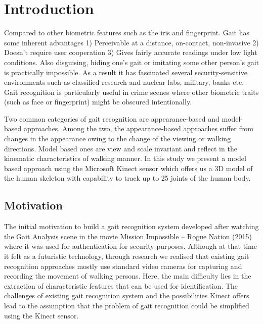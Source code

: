 \chapter{Introduction} \label{Introduction}
\noindent Compared to other biometric features such as the iris and fingerprint. Gait has some inherent advantages
1) Perceivable at a distance, on-contact, non-invasive
2) Doesn’t require user cooperation
3) Gives fairly accurate readings under low light conditions.
Also disguising, hiding one’s gait or imitating some other person’s gait is practically impossible. As a result it has fascinated several security-sensitive environments such as classified research and nuclear labs, military, banks etc. Gait recognition is particularly useful in crime scenes where other biometric traits (such as face or fingerprint) might be obscured intentionally.

\noindent Two common categories of gait recognition are appearance-based and model-based approaches. Among the two, the appearance-based approaches suffer from changes in the appearance owing to the change of the viewing or walking directions. Model based ones are view and scale invariant and reflect in the kinematic characteristics of walking manner. In this study we present a model based approach using the Microsoft Kinect sensor which offers us a 3D model of the human skeleton with capability to track up to 25 joints of the human body.
\section{Motivation}\label{Motivation}
\noindent The initial motivation to build a gait recognition system developed after watching the Gait Analysis scene in the movie Mission Impossible – Rogue Nation (2015) where it was used for authentication for security purposes. Although at that time it felt as a futuristic technology, through research we realised that existing gait recognition approaches mostly use standard video cameras for capturing and recording the movement of walking persons. Here, the main difficulty lies in the extraction of characteristic features that can be used for identification. The challenges of existing gait recognition system and the possibilities Kinect offers lead to the assumption that the problem of gait recognition could be simplified using the Kinect sensor.

